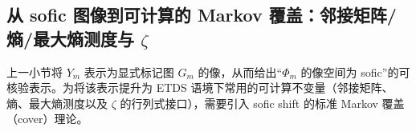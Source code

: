 \subsection{从 sofic 图像到可计算的 Markov 覆盖：邻接矩阵/熵/最大熵测度与 \texorpdfstring{$\zeta$}{zeta}}\label{subsec:Phi_m-fischer}
上一小节将 $Y_m$ 表示为显式标记图 $G_m$ 的像，从而给出“$\Phi_m$ 的像空间为 sofic”的可核验表示。为将该表示提升为 ETDS 语境下常用的可计算不变量（邻接矩阵、熵、最大熵测度以及 \(\zeta\) 的行列式接口），需要引入 sofic shift 的标准 Markov 覆盖（cover）理论。











